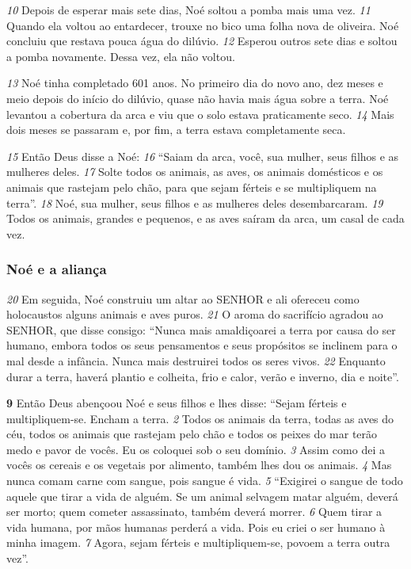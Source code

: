 \bigskip
\textit{\tiny 10}
 Depois de esperar mais sete dias, Noé soltou a pomba mais uma vez. 
\textit{\tiny 11}
 Quando ela voltou ao entardecer, trouxe no bico uma folha nova de oliveira. Noé concluiu que restava pouca água do dilúvio. 
\textit{\tiny 12}
 Esperou outros sete dias e soltou a pomba novamente. Dessa vez, ela não voltou.


\bigskip
\textit{\tiny 13}
 Noé tinha completado 601 anos. No primeiro dia do novo ano, dez meses e meio depois do início do dilúvio, quase não havia mais água sobre a terra. Noé levantou a cobertura da arca e viu que o solo estava praticamente seco. 
\textit{\tiny 14}
 Mais dois meses se passaram e, por fim, a terra estava completamente seca.


\bigskip
\textit{\tiny 15}
 Então Deus disse a Noé: 
\textit{\tiny 16}
 “Saiam da arca, você, sua mulher, seus filhos e as mulheres deles. 
\textit{\tiny 17}
 Solte todos os animais, as aves, os animais domésticos e os animais que rastejam pelo chão, para que sejam férteis e se multipliquem na terra”. 
\textit{\tiny 18}
 Noé, sua mulher, seus filhos e as mulheres deles desembarcaram. 
\textit{\tiny 19}
 Todos os animais, grandes e pequenos, e as aves saíram da arca, um casal de cada vez.


\bigskip
\subsubsection*{Noé e a aliança}
\textit{\tiny 20}
 Em seguida, Noé construiu um altar ao SENHOR e ali ofereceu como holocaustos alguns animais e aves puros. 
\textit{\tiny 21}
 O aroma do sacrifício agradou ao SENHOR, que disse consigo: “Nunca mais amaldiçoarei a terra por causa do ser humano, embora todos os seus pensamentos e seus propósitos se inclinem para o mal desde a infância. Nunca mais destruirei todos os seres vivos. 
\textit{\tiny 22}
 Enquanto durar a terra, haverá plantio e colheita, frio e calor, verão e inverno, dia e noite”.

\bigskip
\textbf{\large 9}
 Então Deus abençoou Noé e seus filhos e lhes disse: “Sejam férteis e multipliquem-se. Encham a terra. 
\textit{\tiny 2}
 Todos os animais da terra, todas as aves do céu, todos os animais que rastejam pelo chão e todos os peixes do mar terão medo e pavor de vocês. Eu os coloquei sob o seu domínio. 
\textit{\tiny 3}
 Assim como dei a vocês os cereais e os vegetais por alimento, também lhes dou os animais. 
\textit{\tiny 4}
 Mas nunca comam carne com sangue, pois sangue é vida. 
\textit{\tiny 5}
 “Exigirei o sangue de todo aquele que tirar a vida de alguém. Se um animal selvagem matar alguém, deverá ser morto; quem cometer assassinato, também deverá morrer. 
\textit{\tiny 6}
 Quem tirar a vida humana, por mãos humanas perderá a vida. Pois eu criei o ser humano à minha imagem. 
\textit{\tiny 7}
 Agora, sejam férteis e multipliquem-se, povoem a terra outra vez”.



